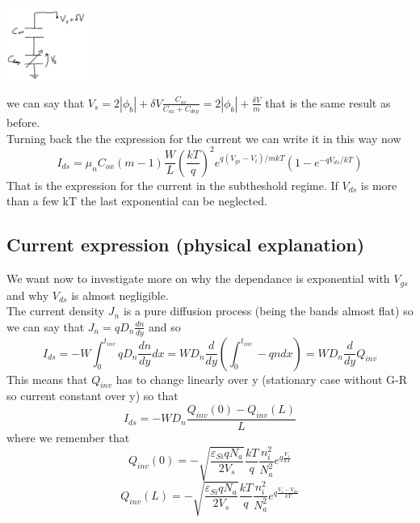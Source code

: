 \centering
\includegraphics[width=0.2\textwidth]{subth2.png}\\
\raggedright

we can say that $V_s=2|\phi_b|+\delta V \frac{C_{ox}}{C_{ox}+C_{dep}}=2|\phi_b|+\frac{\delta V}{m}$ that is the same result as before.\\
Turning back the the expression for the current we can write it in this way now
\begin{equation}
I_{ds}=\mu_nC_{ox}(m-1)\frac{W}{L}(\frac{kT}{q})^2 e^{q(V_{gs}-V_t)/mkT}\left(1-e^{-qV_{ds}/kT}\right)
\end{equation}
That is the expression for the current in the subtheshold regime. If $V_{ds}$ is more than a few kT the last exponential can be neglected.\\

\subsection{Current expression (physical explanation)}

We want now to investigate more on why the dependance is exponential with $V_{gs}$ and why $V_{ds}$ is almost negligible.\\
The current density $J_n$ is a pure diffusion process (being the bands almost flat) so we can say that $J_n=qD_n \frac{dn}{dy}$ and so
\begin{equation}
I_{ds}=-W\int^{t_{inv}}_0qD_n \frac{dn}{dy}dx=WD_n \frac{d}{dy}\left(\int^{t_{inv}}_0 -qndx\right)=WD_n \frac{d}{dy}Q_{inv}
\end{equation}
This means that $Q_{inv}$ has to change linearly over y (stationary case without G-R so current constant over y) so that 
\begin{equation}
I_{ds}=-WD_n \frac{Q_{inv}(0)-Q_{inv}(L)}{L}
\end{equation}
where we remember that 
\begin{equation}
Q_{inv}(0)=-\sqrt{\frac{\varepsilon_{Si}qN_a}{2V_s}}	\frac{kT}{q}\frac{n_i^2}{N_a^2}e^{q\frac{V_s}{kT}}
\end{equation}
\begin{equation}
Q_{inv}(L)=-\sqrt{\frac{\varepsilon_{Si}qN_a}{2V_s}}	\frac{kT}{q}\frac{n_i^2}{N_a^2}e^{q \frac{V_s-V_{ds}}{kT}}
\end{equation}

